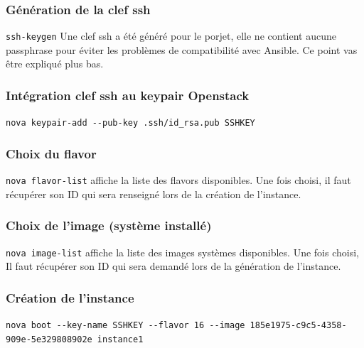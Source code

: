 \documentclass[]{article}
\begin{document}
\subsubsection{Génération de la clef
ssh}\label{guxe9nuxe9ration-de-la-clef-ssh}

\texttt{ssh-keygen}
Une clef ssh a été généré pour le porjet, elle ne contient aucune passphrase pour éviter les problèmes de compatibilité avec Ansible. Ce point vas être expliqué plus bas.

\subsubsection{Intégration clef ssh au keypair
Openstack}\label{intuxe9gration-clef-ssh-au-keypair-openstack}

\texttt{nova\ keypair-add\ -\/-pub-key\ .ssh/id\_rsa.pub\ SSHKEY}

\subsubsection{Choix du flavor}\label{choix-du-flavor}

\texttt{nova\ flavor-list} affiche la liste des flavors disponibles. Une
fois choisi, il faut récupérer son ID qui sera renseigné lors de la
création de l'instance.

\subsubsection{Choix de l'image (système
installé)}\label{choix-de-limage-systuxe8me-installuxe9}

\texttt{nova\ image-list} affiche la liste des images systèmes
disponibles. Une fois choisi, Il faut récupérer son ID qui sera demandé
lors de la génération de l'instance.

\subsubsection{Création de l'instance}\label{cruxe9ation-de-linstance-1}

\texttt{nova\ boot\ -\/-key-name\ SSHKEY\ -\/-flavor\ 16\ -\/-image\ 185e1975-c9c5-4358-909e-5e329808902e\ instance1}
\end{document}
